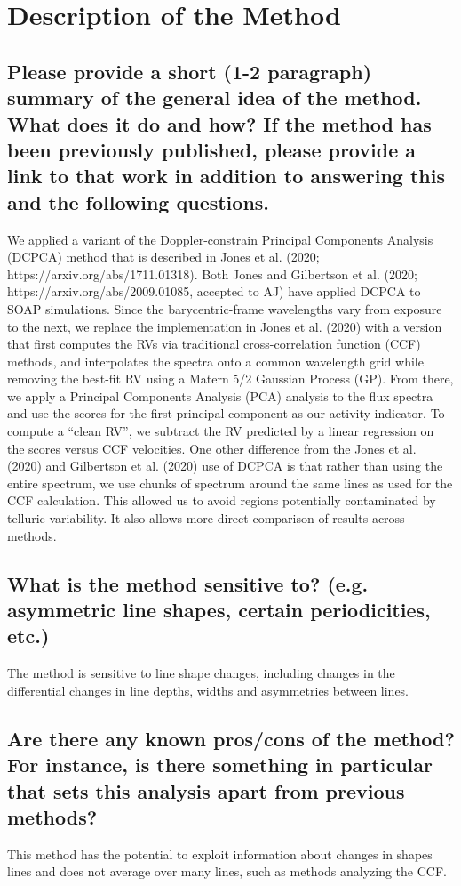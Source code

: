\documentclass[12pt]{article}
\begin{document}
\section{Description of the Method}
\subsection{Please provide a short (1-2 paragraph) summary of the general idea of the method.  What does it do and how?  If the method has been previously published, please provide a link to that work in addition to answering this and the following questions.}

We applied a variant of the Doppler-constrain Principal Components Analysis (DCPCA) method that is described in Jones et al. (2020; https://arxiv.org/abs/1711.01318).
Both Jones and Gilbertson et al. (2020; https://arxiv.org/abs/2009.01085, accepted to AJ) have applied DCPCA to SOAP simulations.
Since the barycentric-frame wavelengths vary from exposure to the next, we replace the implementation in Jones et al. (2020) with a version that first computes the RVs via traditional cross-correlation function (CCF) methods, and interpolates the spectra onto a common wavelength grid while removing the best-fit RV using a Matern 5/2 Gaussian Process (GP).
From there, we apply a Principal Components Analysis (PCA) analysis to the flux spectra and use the scores for the first principal component as our activity indicator.
To compute a ``clean RV'', we subtract the RV predicted by a linear regression on the scores versus CCF velocities.
One other difference from the Jones et al. (2020) and Gilbertson et al. (2020) use of DCPCA is that rather than using the entire spectrum, we use chunks of spectrum around the same lines as used for the CCF calculation.
This allowed us to avoid regions potentially contaminated by telluric variability.
It also allows more direct comparison of results across methods.


\subsection{What is the method sensitive to? (e.g. asymmetric line shapes, certain periodicities, etc.)}
The method is sensitive to line shape changes, including changes in the differential changes in line depths, widths and asymmetries between lines.

\subsection{Are there any known pros/cons of the method?  For instance, is there something in particular that sets this analysis apart from previous methods?}
This method has the potential to exploit information about changes in shapes lines and does not average over many lines, such as methods analyzing the CCF.
\end{document}
